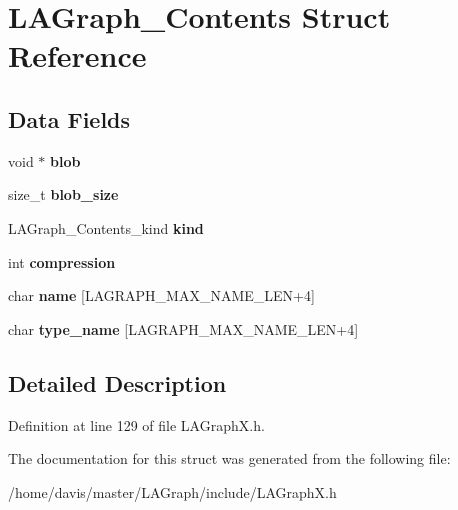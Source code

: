 \hypertarget{structLAGraph__Contents}{}\section{L\+A\+Graph\+\_\+\+Contents Struct Reference}
\label{structLAGraph__Contents}
\subsection*{Data Fields}
\begin{DoxyCompactItemize}
\item 
\mbox{\label{structLAGraph__Contents_aa418fae9342de0ed8e9f3a2a0bfea2a6}} 
void $\ast$ {\bfseries blob}
\item 
\mbox{\label{structLAGraph__Contents_ac46d75b48228176fac0df9954ac76528}} 
size\+\_\+t {\bfseries blob\+\_\+size}
\item 
\mbox{\label{structLAGraph__Contents_a1f83a589f68bffbdf8293c540cc0c2f0}} 
L\+A\+Graph\+\_\+\+Contents\+\_\+kind {\bfseries kind}
\item 
\mbox{\label{structLAGraph__Contents_a8a56983e4e9af2897ae4262f270512cd}} 
int {\bfseries compression}
\item 
\mbox{\label{structLAGraph__Contents_af95e590f545dcebc6f9ac782d14a7ef8}} 
char {\bfseries name} \mbox{[}L\+A\+G\+R\+A\+P\+H\+\_\+\+M\+A\+X\+\_\+\+N\+A\+M\+E\+\_\+\+L\+EN+4\mbox{]}
\item 
\mbox{\label{structLAGraph__Contents_a73225bd599636100e61278e8b7ea3cf2}} 
char {\bfseries type\+\_\+name} \mbox{[}L\+A\+G\+R\+A\+P\+H\+\_\+\+M\+A\+X\+\_\+\+N\+A\+M\+E\+\_\+\+L\+EN+4\mbox{]}
\end{DoxyCompactItemize}


\subsection{Detailed Description}


Definition at line 129 of file L\+A\+Graph\+X.\+h.



The documentation for this struct was generated from the following file\+:\begin{DoxyCompactItemize}
\item 
/home/davis/master/\+L\+A\+Graph/include/L\+A\+Graph\+X.\+h\end{DoxyCompactItemize}
